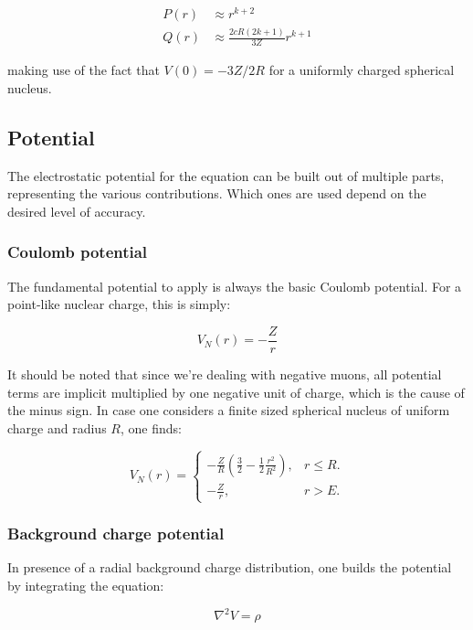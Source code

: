 \documentclass[]{report}
\begin{document}
\begin{align}
P(r) &\approx r^{k+2} \\
Q(r) &\approx \frac{2cR(2k+1)}{3Z}r^{k+1}
\end{align}

making use of the fact that $V(0) = -3Z/2R$ for a uniformly charged spherical nucleus.

\subsection{Potential}\label{num_pot}

The electrostatic potential for the equation can be built out of multiple parts, representing the various contributions. Which ones are used depend on the desired level of accuracy.

\subsubsection{Coulomb potential}

The fundamental potential to apply is always the basic Coulomb potential. For a point-like nuclear charge, this is simply:

\begin{equation}
	V_N(r) = -\frac{Z}{r}
\end{equation}

It should be noted that since we're dealing with negative muons, all potential terms are implicit multiplied by one negative unit of charge, which is the cause of the minus sign. In case one considers a finite sized spherical nucleus of uniform charge and radius $R$, one finds:

\begin{equation}
V_N(r) = \begin{cases}
-\frac{Z}{R}\left(\frac{3}{2}-\frac{1}{2}\frac{r^2}{R^2}\right), & \text{$r\leq R$}.\\
-\frac{Z}{r}, & \text{$r > E$}.
\end{cases}
\end{equation}

\subsubsection{Background charge potential}\label{subsec_bkg_pot}
In presence of a radial background charge distribution, one builds the potential by integrating the equation:

\begin{equation}
\nabla^2 V = \rho
\end{equation}
\end{document}
